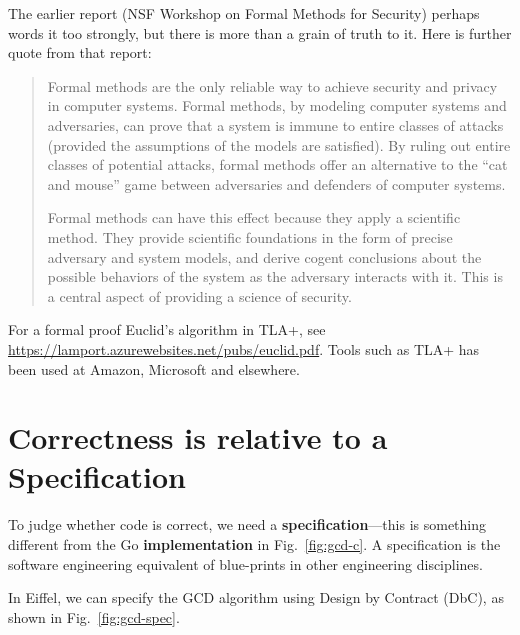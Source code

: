 \documentclass[runningheads,12pt]{article}
\begin{document}
The earlier report (NSF Workshop on Formal Methods for Security) perhaps words it too strongly, but there is more than a grain of truth to it. Here is further quote from that report:

\begin{quote}
Formal methods are the only reliable way to achieve security and privacy in computer systems. Formal methods, by modeling computer systems and adversaries, can prove that a system is immune to entire classes of attacks (provided the assumptions of the models are satisfied). By ruling out entire classes of potential attacks, formal methods offer an alternative to the “cat and mouse” game between adversaries and defenders of computer systems.

Formal methods can have this effect because they apply a scientific method. They provide scientific foundations in the form of precise adversary and system models, and derive cogent conclusions about the possible behaviors of the system as the adversary interacts with it. This is a central aspect of providing a science of security.
\end{quote}

For a formal proof Euclid's algorithm in TLA+, see \url{https://lamport.azurewebsites.net/pubs/euclid.pdf}.  Tools such as TLA+ has been used at Amazon, Microsoft and elsewhere. 

\section{Correctness is relative to a Specification}

To judge whether code is correct, we need a \textbf{specification}---this is something different from the Go \textbf{implementation} in Fig.~\ref{fig:gcd-c}. A specification is the software engineering equivalent of blue-prints in other engineering disciplines.

In Eiffel, we can specify the GCD algorithm using Design by Contract (DbC), as shown in Fig.~\ref{fig:gcd-spec}.
\end{document}
